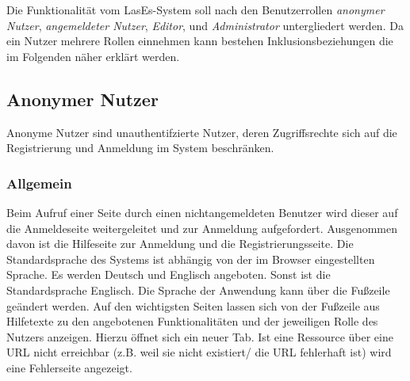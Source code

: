 
Die Funktionalität vom LasEs-System soll nach den Benutzerrollen
\textit{anonymer Nutzer}, \textit{angemeldeter Nutzer}, \textit{Editor}, und
\textit{Administrator} untergliedert werden. Da ein Nutzer mehrere Rollen einnehmen
kann bestehen Inklusionsbeziehungen die im Folgenden näher erklärt werden.

\subsection{Anonymer Nutzer}
Anonyme Nutzer sind unauthentifzierte Nutzer, deren Zugriffsrechte sich
auf die Registrierung und Anmeldung im System beschränken.

\subsubsection{Allgemein}
\begin{description}
     Beim Aufruf einer Seite durch einen nichtangemeldeten Benutzer
    wird dieser auf die Anmeldeseite weitergeleitet und zur
    Anmeldung aufgefordert. Ausgenommen davon ist die Hilfeseite zur Anmeldung und die
    Registrierungsseite.
     Die Standardsprache des Systems ist abhängig von der im Browser
    eingestellten Sprache. Es werden Deutsch und Englisch angeboten.
    Sonst ist die Standardsprache Englisch. Die Sprache der Anwendung kann über die
    Fußzeile geändert werden.
     Auf den wichtigsten Seiten lassen sich von der Fußzeile aus
    Hilfetexte zu den angebotenen Funktionalitäten und der jeweiligen Rolle
    des Nutzers anzeigen. Hierzu öffnet sich ein neuer Tab.
     Ist eine Ressource über eine URL nicht erreichbar (z.B. weil sie nicht existiert/
     die URL fehlerhaft ist) wird eine Fehlerseite angezeigt.%
\end{description}

